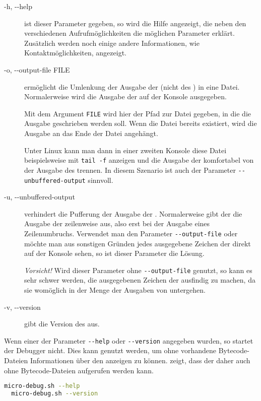 \begin{description}
\item[-h, -{}-help]
  ist dieser Parameter gegeben, so wird die Hilfe angezeigt, die neben den verschiedenen Aufrufmöglichkeiten die möglichen Parameter erklärt. Zusätzlich werden noch einige andere Informationen, wie Kontaktmöglichkeiten, angezeigt.

\item[-o, -{}-output-file FILE]
  ermöglicht die Umlenkung der Ausgabe der \mic{} (nicht des \md{}) in eine Datei. Normalerweise wird die Ausgabe der \mic{} auf der Konsole ausgegeben.

  Mit dem Argument \texttt{FILE} wird hier der Pfad zur Datei gegeben, in die die Ausgabe geschrieben werden soll. Wenn die Datei bereits existiert, wird die Ausgabe an das Ende der Datei angehängt.

  Unter Linux kann man dann in einer zweiten Konsole diese Datei beispielsweise mit \texttt{tail -f} anzeigen und die Ausgabe der \mic{} komfortabel von der Ausgabe des \md{} trennen. In diesem Szenario ist auch der Parameter \texttt{-{}-unbuffered-output} sinnvoll.
\item[-u, -{}-unbuffered-output]
  verhindert die Pufferung der Ausgabe der \mic{}. Normalerweise gibt der \md{} die Ausgabe der \mic{} zeilenweise aus, also erst bei der Ausgabe eines Zeilenumbruchs. Verwendet man den Parameter \texttt{-{}-output-file} oder möchte man aus sonstigen Gründen jedes ausgegebene Zeichen der \mic{} direkt auf der Konsole sehen, so ist dieser Parameter die Lösung.

  \emph{Vorsicht!} Wird dieser Parameter ohne \texttt{-{}-output-file} genutzt, so kann es sehr schwer werden, die ausgegebenen Zeichen der \mic{} ausfindig zu machen, da sie womöglich in der Menge der Ausgaben von \md{} untergehen.

\item[-v, -{}-version]
  gibt die Version des \md{} aus.
\end{description}

Wenn einer der Parameter \texttt{-{}-help} oder \texttt{-{}-version} angegeben wurden, so startet der Debugger nicht. Dies kann genutzt werden, um ohne vorhandene Bytecode-Dateien Informationen über den \md{} anzeigen zu können.  zeigt, dass der \md{} daher auch ohne Bytecode-Dateien aufgerufen werden kann.

\begin{lstlisting}[language=sh,caption={Aufruf des \md{} ohne Start -- Konsolenversion},label=\lstlbl{aufrufe-ohne-start}]
  micro-debug.sh --help
  micro-debug.sh --version
\end{lstlisting}

